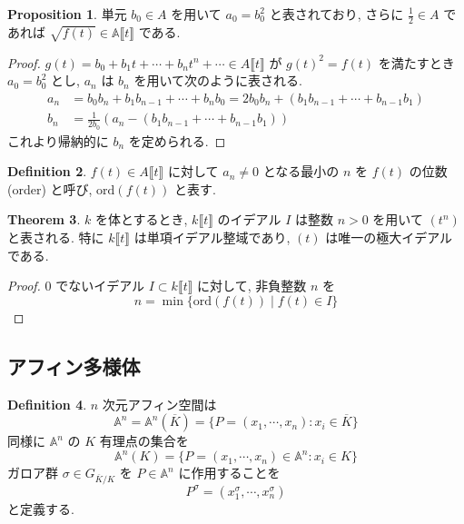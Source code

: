 \documentclass[a4paper,dvipdfmx]{jsarticle}
\theoremstyle{definition}
\newtheorem{dfn}{Definition}[section]
\newtheorem{prop}[dfn]{Proposition}
\newtheorem{thm}[dfn]{Theorem}
\begin{document}
\begin{prop}
  単元 $b_0\in A$ を用いて $a_0 = b_0^2$ と表されており, さらに $\frac{1}{2}\in A$ であれば $\sqrt{f(t)}\in\mathbb{A}\llbracket t\rrbracket$ である.
\end{prop}
\begin{proof}
  $g(t) = b_0 + b_1t +\cdots+ b_nt^n +\cdots\in A\llbracket t\rrbracket$ が $g(t)^2 = f(t)$ を満たすとき $a_0 = b_0^2$ とし, $a_n$ は $b_n$ を用いて次のように表される.
  \begin{align}
    a_n & = b_0b_n + b_1b_{n-1} + \cdots + b_nb_0 = 2b_0b_n + (b_1b_{n-1} + \cdots + b_{n-1}b_1) \\
    b_n & = \frac{1}{2b_0}(a_n - (b_1b_{n-1} + \cdots + b_{n-1}b_1))
  \end{align}
  これより帰納的に $b_n$ を定められる.
\end{proof}

\begin{dfn}
  $f(t)\in A\llbracket t\rrbracket$ に対して $a_n \neq 0$ となる最小の $n$ を $f(t)$ の位数 (order) と呼び, $\mathrm{ord}(f(t))$ と表す.
\end{dfn}

\begin{thm}
  $k$ を体とするとき, $k\llbracket t\rrbracket$ のイデアル $I$ は整数 $n > 0$ を用いて $(t^n)$ と表される. 特に $k\llbracket t\rrbracket$ は単項イデアル整域であり, $(t)$ は唯一の極大イデアルである.
\end{thm}
\begin{proof}
  $0$ でないイデアル $I\subset k\llbracket t\rrbracket$ に対して, 非負整数 $n$ を
  $$
    n = \min\lbrace\mathrm{ord}(f(t))\mid f(t)\in I\rbrace
  $$

\end{proof}

\subsection{アフィン多様体}

\begin{dfn}
  $n$ 次元アフィン空間は
  $$
    \mathbb{A}^n = \mathbb{A}^n(\overline{K}) = \lbrace P = (x_1,\cdots,x_n):x_i\in\overline{K}\rbrace
  $$
  同様に $\mathbb{A}^n$ の $K$ 有理点の集合を
  $$
    \mathbb{A}^n(K) = \lbrace P = (x_1,\cdots,x_n)\in\mathbb{A}^n:x_i\in K\rbrace
  $$
  ガロア群 $\sigma\in G_{\overline{K}/K}$ を $P\in\mathbb{A}^n$ に作用することを
  $$
    P^\sigma = (x_1^\sigma,\cdots,x_n^\sigma)
  $$
  と定義する.
\end{dfn}
\end{document}
